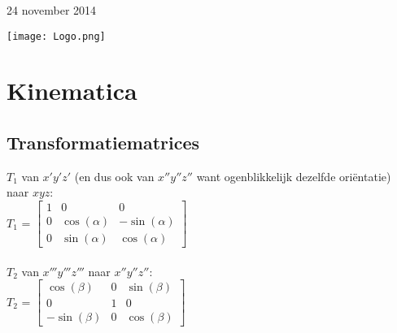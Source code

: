 \documentclass[a4paper,10pt]{article}
\begin{document}
\begin{titlepage}

{\large 24 november 2014}\\[3cm] %

\begin{center}
 \texttt{[image: Logo.png]}\\[1cm] %
\end{center}

\vfill %

\end{titlepage}
\pagestyle{fancy}
\fancyhf{}
\fancyfoot[R]{\thepage}
\tableofcontents
\section{Kinematica}
\subsection{Transformatiematrices}
$T_{1}$ van $x'y'z'$ (en dus ook van $x''y''z''$ want ogenblikkelijk dezelfde oriëntatie) naar $xyz$:\\
$T_{1}$ =
$\begin{bmatrix}
	1 & 0 & 0 \\
	0 & \cos(\alpha) & -\sin(\alpha) \\
	0 & \sin(\alpha) & \cos(\alpha)
\end{bmatrix}$\\\\
$T_{2}$ van $x'''y'''z'''$ naar $x''y''z''$: \\
$T_{2}$ =
$\begin{bmatrix}
	\cos(\beta) & 0 & \sin(\beta) \\
	0 & 1 & 0 \\
	-\sin(\beta) & 0 & \cos(\beta)
\end{bmatrix}$
\end{document}

